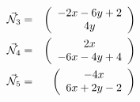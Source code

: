 \begin{itemize}
\begin{eqnarray}
\vec{{\mathcal{N}}}_3 &=&  \left(\begin{array}{c} -2x-6y+2 \\ 4y   \end{array}\right) \nonumber\\  
\vec{{\mathcal{N}}}_4 &=&  \left(\begin{array}{c} 2x \\ -6x-4y+4   \end{array}\right) \nonumber\\  
\vec{{\mathcal{N}}}_5 &=&  \left(\begin{array}{c} -4x \\ 6x +2y -2 \end{array}\right) \nonumber
\end{eqnarray}

 

















\end{itemize}

